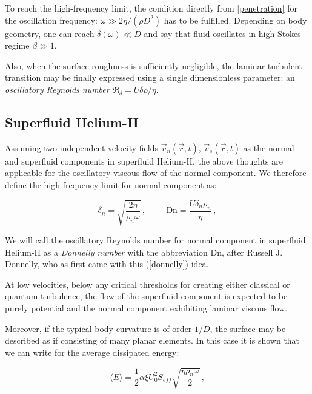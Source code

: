 To reach the high-frequency limit, the condition directly from \ref{penetration} for the oscillation frequency: $\omega \gg 2\eta / (\rho D^2)$ has to be fulfilled. Depending on body geometry, one can reach $\delta(\omega) \ll D$ and say that fluid oscillates in high-Stokes regime $\beta \gg 1$.

Also, when the surface roughness is sufficiently negligible, the laminar-turbulent transition may be finally expressed using a single dimensionless parameter: an \textit{oscillatory Reynolds number} $\Re_{\delta} = U \delta \rho / \eta$.


\subsection*{Superfluid Helium-II}

Assuming two independent velocity fields $\vec{v}_n (\vec{r}, t)$, $\vec{v}_s (\vec{r}, t)$ as the normal and superfluid components in superfluid Helium-II, the above thoughts are applicable for the oscillatory viscous flow of the normal component. We therefore define the high frequency limit for normal component as:

\begin{equation}
\delta_n = \sqrt{\frac{2\eta}{\rho_n\omega}}\,,
\hspace{1cm}
\text{Dn} = \frac{U \delta_n \rho_n}{\eta}
\label{donnelly}\,,
\end{equation}

We will call the oscillatory Reynolds number for normal component in superfluid Helium-II as a \textit{Donnelly number} with the abbreviation Dn, after Russell J. Donnelly, who as first came with this (\ref{donnelly}) idea.

At low velocities, below any critical thresholds for creating either classical or quantum turbulence, the flow of the superfluid component is expected to be purely potential and the normal component exhibiting laminar viscous flow.

Moreover, if the typical body curvature is of order $1/D$, the surface may be described as if consisting of many planar elements. In this case it is shown \cite{universal_scaling} that we can write for the average dissipated energy:

\begin{equation}
\langle \dot{E} \rangle =
\frac{1}{2} \alpha \xi U_0^2 S_{eff} \sqrt{\frac{\eta \rho_n \omega}{2}}\,,
\label{energy_loss}
\end{equation}


